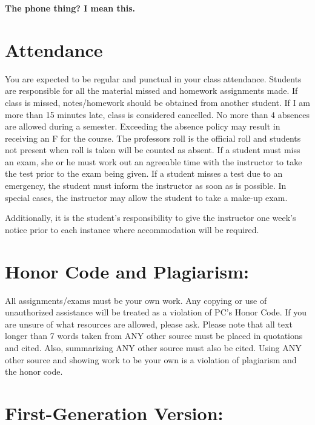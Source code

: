 \documentclass[
]{book}
\begin{document}
\textbf{The phone thing? I mean this.}

\hypertarget{attendance}{%
\section*{Attendance}\label{attendance}}

You are expected to be regular and punctual in your class attendance. Students are responsible for all the material missed and homework assignments made. If class is missed, notes/homework should be obtained from another student. If I am more than 15 minutes late, class is considered cancelled. No more than 4 absences are allowed during a semester. Exceeding the absence policy may result in receiving an F for the course. The professors roll is the official roll and students not present when roll is taken will be counted as absent. If a student must miss an exam, she or he must work out an agreeable time with the instructor to take the test prior to the exam being given. If a student misses a test due to an emergency, the student must inform the instructor as soon as is possible. In special cases, the instructor may allow the student to take a make-up exam.

Additionally, it is the student's responsibility to give the instructor one week's notice prior to each instance where accommodation will be required.

\hypertarget{honor-code-and-plagiarism}{%
\section*{Honor Code and Plagiarism:}\label{honor-code-and-plagiarism}}

All assignments/exams must be your own work. Any copying or use of unauthorized assistance will be treated as a violation of PC's Honor Code. If you are unsure of what resources are allowed, please ask. Please note that all text longer than 7 words taken from ANY other source must be placed in quotations and cited. Also, summarizing ANY other source must also be cited. Using ANY other source and showing work to be your own is a violation of plagiarism and the honor code.

\hypertarget{first-generation-version}{%
\section*{First-Generation Version:}\label{first-generation-version}}
\end{document}
